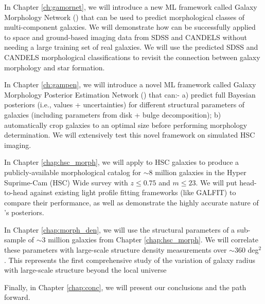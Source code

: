 In Chapter \ref{ch:gamornet}, we will introduce a new ML framework called Galaxy Morphology Network (\gamornet) that can be used to predict morphological classes of multi-component galaxies. We will demonstrate how \gamornet{} can be successfully applied to space and ground-based imaging data from SDSS and CANDELS without needing a large training set of real galaxies. We will use the predicted SDSS and CANDELS morphological classifications to revisit the connection between galaxy morphology and star formation.

In Chapter \ref{ch:gampen}, we will introduce a novel ML framework called Galaxy Morphology Posterior Estimation Network (\gampen{}) that can:- a) predict full Bayesian posteriors (i.e., values + uncertainties) for different structural parameters of galaxies (including parameters from disk + bulge decomposition); b) automatically crop galaxies to an optimal size before performing morphology determination. We will extensively test this novel framework on simulated HSC imaging.

In Chapter \ref{chap:hsc_morph}, we will apply \gampen{} to HSC galaxies to produce a publicly-available morphological catalog for $\sim 8$ million galaxies in the Hyper Suprime-Cam (HSC) Wide survey with $z \leq 0.75$ and $m \leq 23$. We will put \gampen{} head-to-head against existing light profile fitting frameworks (like GALFIT) to compare their performance, as well as demonstrate the highly accurate nature of \gampen{}'s posteriors.

In Chapter \ref{chap:morph_den}, we will use the structural parameters of a sub-sample of $\sim3$ million galaxies from Chapter \ref{chap:hsc_morph}. We will correlate these parameters with large-scale structure density measurements over $\sim360$ deg$^2$. This represents the first comprehensive study of the variation of galaxy radius with large-scale structure beyond the local universe

Finally, in Chapter \ref{chap:conc}, we will present our conclusions and the path forward. 